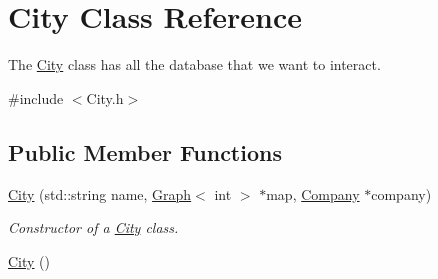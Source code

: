 \hypertarget{class_city}{}\section{City Class Reference}
\label{class_city}


The \hyperlink{class_city}{City} class has all the database that we want to interact.  




{\ttfamily \#include $<$City.\+h$>$}

\subsection*{Public Member Functions}
\begin{DoxyCompactItemize}
\item 
\hyperlink{class_city_a48a5b743f0e420f4a207d24eb79673e3}{City} (std\+::string name, \hyperlink{class_graph}{Graph}$<$ int $>$ $\ast$map, \hyperlink{class_company}{Company} $\ast$company)
\begin{DoxyCompactList}\small\item\em Constructor of a \hyperlink{class_city}{City} class. \end{DoxyCompactList}\item 
\hyperlink{class_city_a1b1f549430f0a7ecd0ec7b1605415193}{City} ()\hypertarget{class_city_a1b1f549430f0a7ecd0ec7b1605415193}{}\label{class_city_a1b1f549430f0a7ecd0ec7b1605415193}


\end{DoxyCompactItemize}
